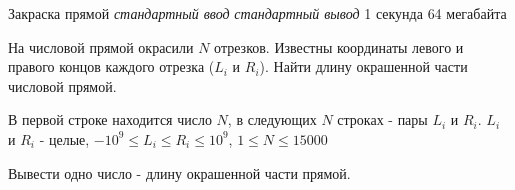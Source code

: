 \begin{problem}%
{Закраска прямой}%
{\textsl{стандартный ввод}}%
{\textsl{стандартный вывод}}%
{1 секунда}%
{64 мегабайта}%
{}

На числовой прямой окрасили $N$ отрезков. Известны координаты левого и правого концов каждого отрезка ($L_i$ и $R_i$). Найти длину окрашенной части числовой прямой.

\InputFile

В первой строке находится число $N$, в следующих $N$ строках - пары $L_i$ и $R_i$. $L_i$ и $R_i$ - целые, $-10^9 \le L_i \le R_i \le 10^9$, $1 \le N \le 15 000$

\OutputFile

Вывести одно число - длину окрашенной части прямой.

\Examples

\begin{example}
%
%
%
\end{example}
\end{problem}

